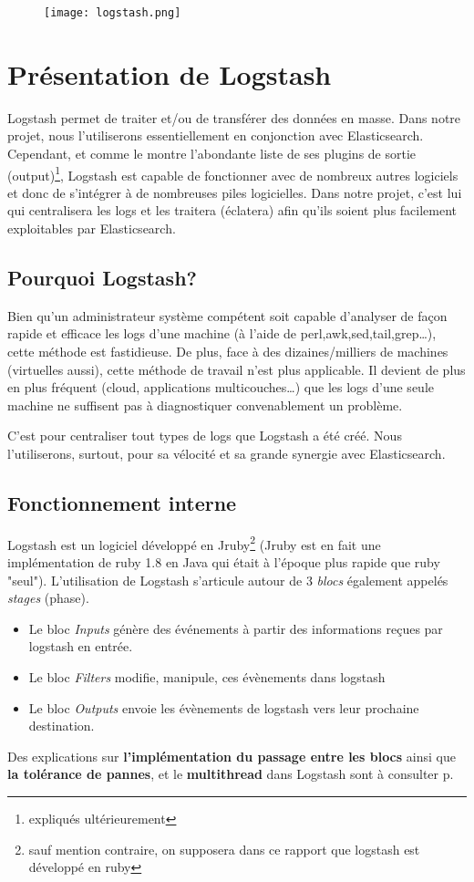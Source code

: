 \begin{figure}[H]
\center
\texttt{[image: logstash.png]}
\label{fig:logstashlogo.png}
\end{figure}
\section{Présentation de Logstash}

Logstash permet de traiter et/ou de transférer des données en masse. Dans notre 
projet, nous l'utiliserons essentiellement en conjonction avec Elasticsearch. 
Cependant, et comme le montre l'abondante liste de ses plugins de sortie (output)\footnote{expliqués
ultérieurement}, Logstash est capable de fonctionner avec de nombreux autres logiciels et donc
de s'intégrer à de nombreuses piles logicielles.
Dans notre projet, c'est lui qui centralisera les \gls{logs} et les traitera (éclatera)
afin qu'ils soient plus facilement exploitables par Elasticsearch.


\subsection{Pourquoi Logstash?}
Bien qu'un administrateur système compétent soit capable d'analyser de façon rapide 
et efficace les logs d'une machine (à l'aide de perl,awk,sed,tail,grep\ldots), cette méthode
est fastidieuse. De plus, face à des dizaines/milliers de machines (virtuelles aussi), 
cette méthode de travail n'est plus applicable.
Il devient de plus en plus fréquent (cloud, applications multicouches\ldots) 
que les logs d'une seule machine ne suffisent pas à diagnostiquer convenablement un 
problème.

C'est pour centraliser tout types de \gls{logs} que Logstash a été créé. Nous
l'utiliserons, surtout, pour sa vélocité et sa grande synergie avec Elasticsearch.

\subsection{Fonctionnement interne}
Logstash est un logiciel développé en Jruby\footnote{sauf mention contraire, on supposera
dans ce rapport que logstash est développé en ruby} (Jruby est en fait une implémentation
de ruby 1.8 en Java qui était à l'époque plus rapide que ruby "seul"). 
L'utilisation de Logstash s'articule autour de 3 \emph{blocs} 
également appelés \emph{stages} (phase).
\begin{itemize}
    \item   Le bloc \emph{Inputs} génère des événements à partir des informations reçues
    par logstash en entrée.
    \item   Le bloc \emph{Filters} modifie, manipule, ces évènements dans logstash
    \item   Le bloc \emph{Outputs} envoie les évènements de logstash vers leur 
    prochaine destination.
\end{itemize}
Des explications sur \textbf{l'implémentation du passage entre les blocs} ainsi que
\textbf{la tolérance de pannes}, et le\textbf{ multithread} dans Logstash sont à 
consulter p\pageref{subsec:passageinterbloc}.\\[2mm]

